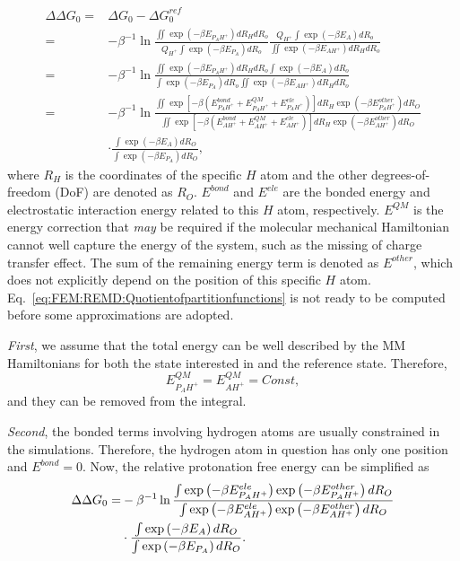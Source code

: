 \begin{align}
	\Delta\Delta G_{0} = & \Delta G_{0}-\Delta G_{0}^{ref}\nonumber \\
	= & -\beta^{-1}\ln\frac{\iint\exp(-\beta E_{P_{A}H^{+}})dR_{H}dR_{o}}{Q_{H^{+}}\int\exp(-\beta E_{P_{A}})dR_{o}}\frac{Q_{H^{+}}\int\exp(-\beta E_{A})dR_{o}}{\iint\exp(-\beta E_{AH^{+}})dR_{H}dR_{o}}\nonumber \\
	= & -\beta^{-1}\ln\frac{\iint\exp(-\beta E_{P_{A}H^{+}})dR_{H}dR_{o}\int\exp(-\beta E_{A})dR_{o}}{\int\exp(-\beta E_{P_{A}})dR_{o}\iint\exp(-\beta E_{AH^{+}})dR_{H}dR_{o}}\nonumber \\
	= & -\beta^{-1}\ln\frac{\iint\exp{\left[-\beta \left(E_{P_{A}H^{+}}^{bond}+E_{P_{A}H^{+}}^{QM}+E_{P_{A}H^{+}}^{ele}\right)\right]}dR_{H}\exp\left(-\beta E_{P_{A}H^{+}}^{other}\right)dR_{O}}{\iint\exp\left[-\beta \left(E_{AH^{+}}^{bond}+E_{AH^{+}}^{QM}+E_{AH^{+}}^{ele}\right)\right]dR_{H}\exp\left(-\beta E_{AH^{+}}^{other}\right)dR_{O}}\nonumber \\
	 & \cdot\frac{\int\exp\left(-\beta E_{A}\right)dR_{O}}{\int\exp\left(-\beta E_{P_{A}}\right)dR_{O}},\label{eq:FEM:REMD:Quotientofpartitionfunctions}
\end{align}
where $R_{H}$ is the coordinates of the specific $H$ atom and the
other degrees-of-freedom (DoF) are denoted as $R_{O}$. $E^{bond}$
and $E^{ele}$ are the bonded energy and electrostatic interaction
energy related to this $H$ atom, respectively. $E^{QM}$ is the energy
correction that \textit{may} be required if the molecular mechanical
Hamiltonian cannot well capture the energy of the system, such as
the missing of charge transfer effect. The sum of the remaining energy
term is denoted as $E^{other}$, which does not explicitly depend
on the position of this specific $H$ atom. Eq.~\ref{eq:FEM:REMD:Quotientofpartitionfunctions}
is not ready to be computed before some approximations are adopted. 

\textit{First}, we assume that the total energy can be well described by the MM Hamiltonians
for both the state interested in and the reference state. Therefore,
\[
E_{P_{A}H^{+}}^{QM}=E_{AH^{+}}^{QM}=Const,
\]
and they can be removed from the integral. 

\textit{Second}, the bonded terms involving hydrogen atoms are usually 
constrained in the simulations. Therefore, the hydrogen atom in question has 
only one position and $E^{bond}=0$. Now, the 
relative protonation free energy can be simplified as
\begin{align}
\Delta\Delta G_{0}=&-\beta^{-1}\ln\frac{\int\exp\left(-\beta E_{P_{A}H^{+}}^{ele}\right)\exp\left(-\beta E_{P_{A}H^{+}}^{other}\right)dR_{O}}{\int\exp\left(-\beta E_{AH^{+}}^{ele}\right)\exp\left(-\beta E_{AH^{+}}^{other}\right)dR_{O}}\notag\\
&\cdot\frac{\int\exp\left(-\beta E_{A}\right)dR_{O}}{\int\exp\left(-\beta E_{P_{A}}\right)dR_{O}}.
\end{align}

